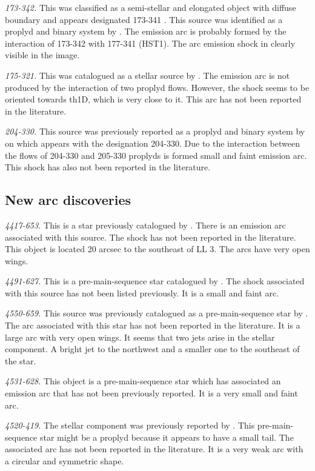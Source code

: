 \documentclass[iop, apj]{emulateapj}
\renewcommand\clearpage{}
\begin{document}
\textit{173-342.} This was classified as a semi-stellar and elongated object with diffuse boundary and appears designated 173-341 \citet{Odell:1994}. This source was identified as a proplyd and binary system by \citet{Ricci:2008a}. The emission arc is probably formed by the interaction of 173-342 with 177-341 (HST1). The arc emission shock in clearly visible in the image. 

\textit{175-321.} This was catalogued as a stellar source by \citet{ODell:1996a}. The emission arc is not produced by the interaction of two proplyd flows. However, the shock seems to be oriented towards th1D, which is very close to it. This arc has not been reported in the literature.

\textit{204-330.} This source was previously reported as a proplyd and binary system by \citet{Ricci:2008a} on which appears with the designation 204-330. Due to the interaction between the flows of 204-330 and 205-330 proplyds is formed small and faint emission arc. This shock has also not been reported in the literature.

\clearpage
\subsection{New arc discoveries}
\label{sec:new}

\textit{4417-653.} This is a star previously catalogued by \citet{Hillenbrand:1997}. There is an emission arc associated with this source. The shock has not been reported in the literature. This object is located 20 arcsec to the southeast of LL 3. The arcs have very open wings.  

\textit{4491-627.} This is a pre-main-sequence star catalogued by \citet{Parihar:2009}. The shock associated with this source has not been listed previously. It is a small and faint arc.

\textit{4550-659.} This source was previously catalogued as a pre-main-sequence star by \citet{Parihar:2009}. The arc associated with this star has not been reported in the literature. It is a large arc with very open wings. It seems that two jets arise in the stellar component. A bright jet to the northwest and a smaller one to the southeast of the star.  

\textit{4531-628.} This object is a pre-main-sequence star \citep{Da-Rio:2009a} which has associated an emission arc that has not been previously reported. It is a very small and faint arc.

\textit{4520-419.} The stellar component was previously reported by \citet{Parihar:2009}. This pre-main-sequence star might be a proplyd because it appears to have a small tail. The associated arc has not been reported in the literature. It is a very weak arc with a circular and symmetric shape. 
\end{document}
